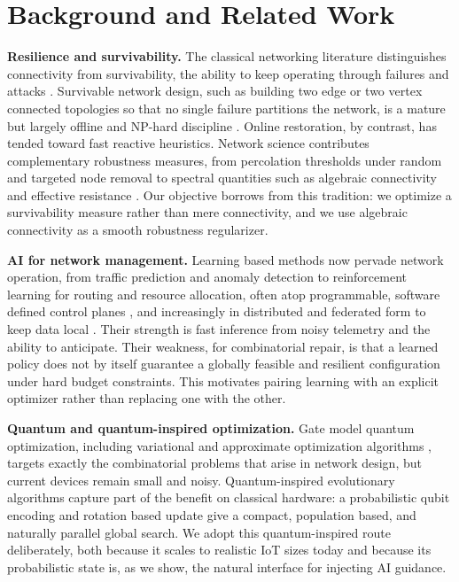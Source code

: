 \documentclass[journal]{IEEEtran}
\begin{document}
\section{Background and Related Work}\label{sec:background}

\noindent\textbf{Resilience and survivability.} The classical networking literature distinguishes connectivity from survivability, the ability to keep operating through failures and attacks \cite{ref2}. Survivable network design, such as building two edge or two vertex connected topologies so that no single failure partitions the network, is a mature but largely offline and NP-hard discipline \cite{ref2}. Online restoration, by contrast, has tended toward fast reactive heuristics. Network science contributes complementary robustness measures, from percolation thresholds under random and targeted node removal \cite{ref14} to spectral quantities such as algebraic connectivity \cite{ref3} and effective resistance \cite{ref6}. Our objective borrows from this tradition: we optimize a survivability measure rather than mere connectivity, and we use algebraic connectivity \cite{ref3} as a smooth robustness regularizer.

\noindent\textbf{AI for network management.} Learning based methods now pervade network operation, from traffic prediction and anomaly detection to reinforcement learning for routing and resource allocation, often atop programmable, software defined control planes \cite{ref15}, and increasingly in distributed and federated form to keep data local \cite{ref10}. Their strength is fast inference from noisy telemetry and the ability to anticipate. Their weakness, for combinatorial repair, is that a learned policy does not by itself guarantee a globally feasible and resilient configuration under hard budget constraints. This motivates pairing learning with an explicit optimizer rather than replacing one with the other.

\noindent\textbf{Quantum and quantum-inspired optimization.} Gate model quantum optimization, including variational and approximate optimization algorithms \cite{ref9,ref13}, targets exactly the combinatorial problems that arise in network design, but current devices remain small and noisy. Quantum-inspired evolutionary algorithms \cite{ref4,ref5} capture part of the benefit on classical hardware: a probabilistic qubit encoding and rotation based update give a compact, population based, and naturally parallel global search. We adopt this quantum-inspired route deliberately, both because it scales to realistic IoT sizes today and because its probabilistic state is, as we show, the natural interface for injecting AI guidance.
\end{document}
